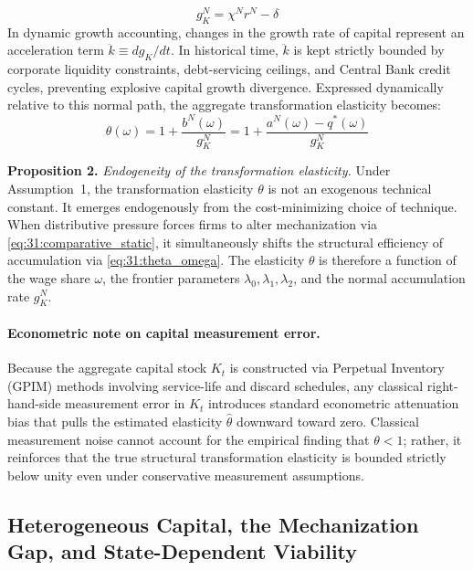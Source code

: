 \begin{equation}
	g_K^N = \chi^N r^N - \delta
	\label{eq:31:gKN}
\end{equation}
In dynamic growth accounting, changes in the growth rate of capital represent an acceleration term $\ddot{k} \equiv d g_K / dt$. In historical time, $\ddot{k}$ is kept strictly bounded by corporate liquidity constraints, debt-servicing ceilings, and Central Bank credit cycles, preventing explosive capital growth divergence. Expressed dynamically relative to this normal path, the aggregate transformation elasticity becomes:
\begin{equation}
	\theta(\omega) = 1 + \frac{b^N(\omega)}{g_K^N}
	= 1 + \frac{a^N(\omega) - q^*(\omega)}{g_K^N}
	\label{eq:31:theta_omega}
\end{equation}

\textbf{Proposition 2.} \textit{Endogeneity of the
	transformation elasticity.} Under Assumption~1, the
transformation elasticity $\theta$ is not an exogenous
technical constant. It emerges endogenously from the
cost-minimizing choice of technique. When distributive
pressure forces firms to alter mechanization via
\eqref{eq:31:comparative_static}, it simultaneously shifts
the structural efficiency of accumulation via
\eqref{eq:31:theta_omega}. The elasticity $\theta$ is
therefore a function of the wage share $\omega$, the frontier
parameters $\lambda_0, \lambda_1, \lambda_2$, and the normal
accumulation rate $g_K^N$.

\paragraph{Econometric note on capital measurement error.}
Because the aggregate capital stock $K_t$ is constructed via Perpetual Inventory (GPIM) methods involving service-life and discard schedules, any classical right-hand-side measurement error in $K_t$ introduces standard econometric attenuation bias that pulls the estimated elasticity $\hat{\theta}$ downward toward zero. Classical measurement noise cannot account for the empirical finding that $\theta < 1$; rather, it reinforces that the true structural transformation elasticity is bounded strictly below unity even under conservative measurement assumptions.


\subsection{Heterogeneous Capital, the Mechanization Gap,
	and State-Dependent Viability}

